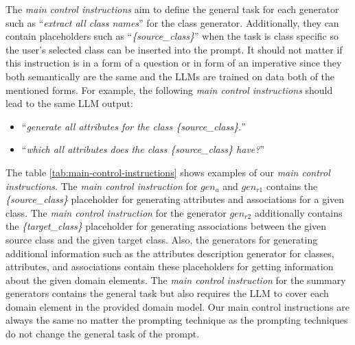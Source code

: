 The \emph{main control instructions} aim to define the general task for each generator such as ``\textit{extract all class names}'' for the class generator. Additionally, they can contain placeholders such as ``\textit{\{source\_class\}}'' when the task is class specific so the user's selected class can be inserted into the prompt. It should not matter if this instruction is in a form of a question or in form of an imperative since they both semantically are the same and the LLMs are trained on data both of the mentioned forms. For example, the following \emph{main control instructions} should lead to the same LLM output:

\begin{itemize}
\item ``\textit{generate all attributes for the class \{source\_class\}.}''
\item ``\textit{which all attributes does the class \{source\_class\} have?}''
\end{itemize}

The table \ref{tab:main-control-instructions} shows examples of our \emph{main control instructions}. The \emph{main control instruction} for $gen_a$ and $gen_{r1}$ contains the \textit{\{source\_class\}} placeholder for generating attributes and associations for a given class. The \emph{main control instruction} for the generator $gen_{r2}$ additionally contains the \textit{\{target\_class\}} placeholder for generating associations between the given source class and the given target class. Also, the generators for generating additional information such as the attributes description generator for classes, attributes, and associations contain these placeholders for getting information about the given domain elements. The \emph{main control instruction} for the summary generators contains the general task but also requires the LLM to cover each domain element in the provided domain model.
Our main control instructions are always the same no matter the prompting technique as the prompting techniques do not change the general task of the prompt.


